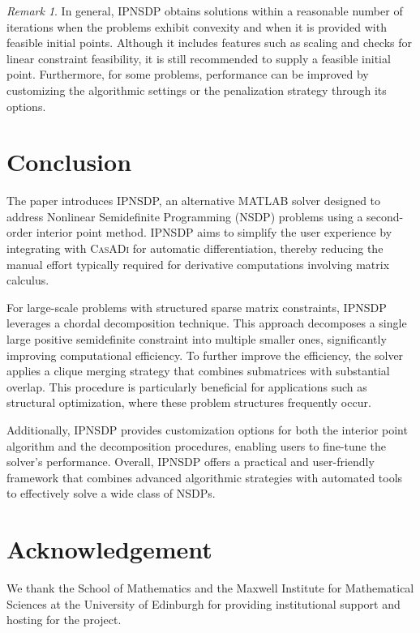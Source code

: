 \documentclass[]{interact}
\theoremstyle{plain}%
\theoremstyle{definition}
\theoremstyle{remark}
\newtheorem{remark}{Remark}
\begin{document}
\begin{remark}
In general, IPNSDP obtains solutions within a reasonable number of iterations when the problems exhibit convexity and when it is provided with feasible initial points. Although it includes features such as scaling and checks for linear constraint feasibility, it is still recommended to supply a feasible initial point. Furthermore, for some problems, performance can be improved by customizing the algorithmic settings or the penalization strategy through its options.
\end{remark}

\section{Conclusion}\label{sec:conc}
The paper introduces IPNSDP, an alternative MATLAB solver designed to address Nonlinear Semidefinite Programming (NSDP) problems using a second-order interior point method. IPNSDP aims to simplify the user experience by integrating with \textsc{CasADi} for automatic differentiation, thereby reducing the manual effort typically required for derivative computations involving matrix calculus.

For large-scale problems with structured sparse matrix constraints, IPNSDP leverages a chordal decomposition technique. This approach decomposes a single large positive semidefinite constraint into multiple smaller ones, significantly improving computational efficiency. To further improve the efficiency, the solver applies a clique merging strategy that combines submatrices with substantial overlap. This procedure is particularly beneficial for applications such as structural optimization, where these problem structures frequently occur.

Additionally, IPNSDP provides customization options for both the interior point algorithm and the decomposition procedures, enabling users to fine-tune the solver’s performance. Overall, IPNSDP offers a practical and user-friendly framework that combines advanced algorithmic strategies with automated tools to effectively solve a wide class of NSDPs.

\section*{Acknowledgement}
We thank the School of Mathematics and the Maxwell Institute for Mathematical Sciences at the University of Edinburgh for providing institutional support and hosting for the project.
\end{document}
